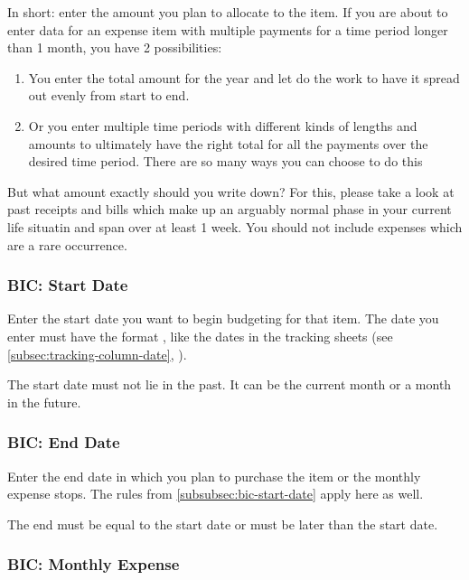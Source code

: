 In short: enter the amount you plan to allocate to the item.
If you are about to enter data for an expense item with multiple payments for a time period longer than 1 month, you have 2 possibilities:
\begin{enumerate}
	\item You enter the total amount for the year and let \tfn do the work to have it spread out evenly from start to end.
	\item Or you enter multiple time periods with different kinds of lengths and amounts to ultimately have the right total for all the payments over the desired time period.
	There are so many ways you can choose to do this
\end{enumerate}

But what amount exactly should you write down?
For this, please take a look at past receipts and bills which make up an arguably normal phase in your current life situatin and span over at least 1 week.
You should not include expenses which are a rare occurrence.

\subsubsection{BIC: Start Date}
\label{subsubsec:bic-start-date}

Enter the start date you want to begin budgeting for that item.
The date you enter must have the format , like the dates in the tracking sheets (see \autoref{subsec:tracking-column-date}, ).

\begin{specialnote}
	The start date must not lie in the past.
	It can be the current month or a month in the future.
\end{specialnote}

\subsubsection{BIC: End Date}
\label{subsubsec:bic-end-date}

Enter the end date in which you plan to purchase the item or the monthly expense stops.
The rules from \autoref{subsubsec:bic-start-date} apply here as well.

\begin{specialnote}
	The end must be equal to the start date or must be later than the start date.
\end{specialnote}

\subsubsection{BIC: Monthly Expense}
\label{subsubsec:bic-monthly-expense}

